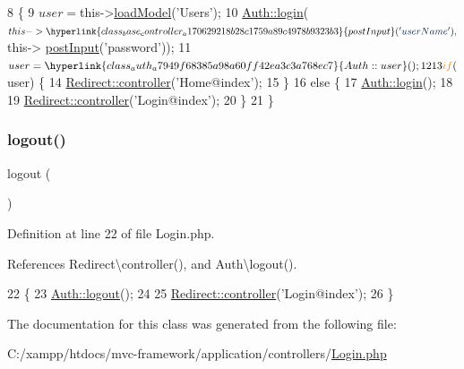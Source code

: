 \begin{DoxyCode}
8                                 \{
9         $user = $this->\hyperlink{class_base_controller_a5fa8890bd3a9d20f5c0cc2377dc49eb1}{loadModel}(\textcolor{stringliteral}{'Users'});
10         \hyperlink{class_auth_a5b58b727794a21b87e23d646eb9ddc6d}{Auth::login}($this->\hyperlink{class_base_controller_a170629218b28c1759a89c4978b9323b3}{postInput}(\textcolor{stringliteral}{'userName'}), $this->
      \hyperlink{class_base_controller_a170629218b28c1759a89c4978b9323b3}{postInput}(\textcolor{stringliteral}{'password'}));
11         $user = \hyperlink{class_auth_a7949f68385a98a60ff42ea3c3a768ec7}{Auth::user}();
12 
13         \textcolor{keywordflow}{if} ($user) \{
14             \hyperlink{class_redirect_ab7d0d268b6aaa9a5470b7cb8c7eb1b61}{Redirect::controller}(\textcolor{stringliteral}{'Home@index'});
15         \}
16         \textcolor{keywordflow}{else} \{
17             \hyperlink{class_auth_a5b58b727794a21b87e23d646eb9ddc6d}{Auth::login}();
18 
19             \hyperlink{class_redirect_ab7d0d268b6aaa9a5470b7cb8c7eb1b61}{Redirect::controller}(\textcolor{stringliteral}{'Login@index'});
20         \}
21     \}
\end{DoxyCode}
\hypertarget{class_login_a082405d89acd6835c3a7c7a08a7adbab}{}\label{class_login_a082405d89acd6835c3a7c7a08a7adbab} 
\subsubsection{\texorpdfstring{logout()}{logout()}}
{\footnotesize\ttfamily logout (\begin{DoxyParamCaption}{ }\end{DoxyParamCaption})}



Definition at line 22 of file Login.\+php.



References Redirect\textbackslash{}controller(), and Auth\textbackslash{}logout().


\begin{DoxyCode}
22                              \{
23         \hyperlink{class_auth_a1e34160e903835a43123f538e93457a2}{Auth::logout}();
24 
25         \hyperlink{class_redirect_ab7d0d268b6aaa9a5470b7cb8c7eb1b61}{Redirect::controller}(\textcolor{stringliteral}{'Login@index'});
26     \}
\end{DoxyCode}


The documentation for this class was generated from the following file\+:\begin{DoxyCompactItemize}
\item 
C\+:/xampp/htdocs/mvc-\/framework/application/controllers/\hyperlink{controllers_2_login_8php}{Login.\+php}\end{DoxyCompactItemize}
